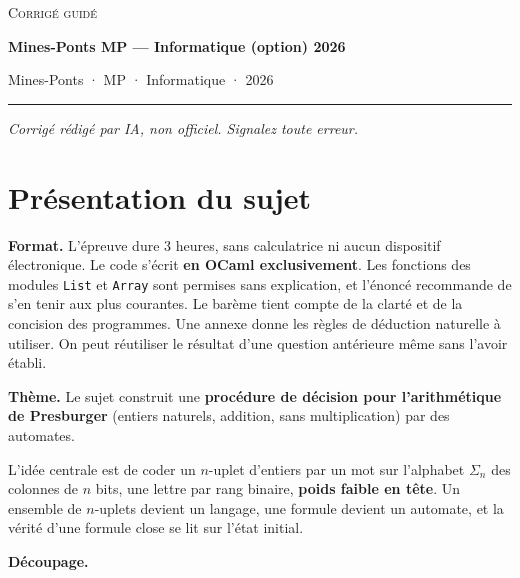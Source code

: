 \documentclass[11pt,a4paper]{article}
\begin{document}
\thispagestyle{plain}
\begin{center}
  {\small\scshape Corrigé guidé}\par\smallskip
  {\LARGE\bfseries Mines-Ponts MP — Informatique (option) 2026\par}\medskip
  {\large Mines-Ponts · MP · Informatique · 2026\par}
\end{center}
\vspace{2pt}\hrule\vspace{8pt}

\emph{Corrigé rédigé par IA, non officiel. Signalez toute erreur.}

\hypertarget{pruxe9sentation-du-sujet}{%
\section{Présentation du sujet}\label{pruxe9sentation-du-sujet}}

\textbf{Format.} L'épreuve dure 3 heures, sans calculatrice ni aucun dispositif électronique. Le code s'écrit \textbf{en OCaml exclusivement}. Les fonctions des modules \texttt{List} et \texttt{Array} sont permises sans explication, et l'énoncé recommande de s'en tenir aux plus courantes. Le barème tient compte de la clarté et de la concision des programmes. Une annexe donne les règles de déduction naturelle à utiliser. On peut réutiliser le résultat d'une question antérieure même sans l'avoir établi.

\textbf{Thème.} Le sujet construit une \textbf{procédure de décision pour l'arithmétique de Presburger} (entiers naturels, addition, sans multiplication) par des automates.

L'idée centrale est de coder un \(n\)-uplet d'entiers par un mot sur l'alphabet \(\Sigma_n\) des colonnes de \(n\) bits, une lettre par rang binaire, \textbf{poids faible en tête}. Un ensemble de \(n\)-uplets devient un langage, une formule devient un automate, et la vérité d'une formule close se lit sur l'état initial.

\textbf{Découpage.}
\end{document}
